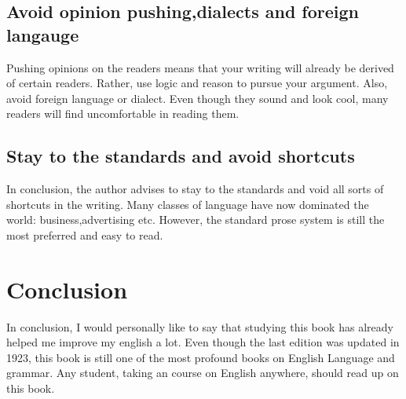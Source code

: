 \documentclass{report}
\begin{document}
\section{Avoid opinion pushing,dialects and foreign langauge}
Pushing opinions on the readers means that your writing will already be derived of certain readers. Rather, use logic and reason to pursue your argument. Also, avoid foreign language or dialect. Even though they sound and look cool, many readers will find uncomfortable in reading them.
\section{Stay to the standards and avoid shortcuts}
In conclusion, the author advises to stay to the standards and void all sorts of shortcuts in the writing. Many classes of language have now dominated the world: business,advertising etc. However, the standard prose system is still the most preferred and easy to read.


\chapter{Conclusion}
In conclusion, I would personally like to say that studying this book has already helped me improve my english a lot. Even though the last edition was updated in 1923, this book is still one of the most profound books on English Language and grammar. Any student, taking an course on English anywhere, should read up on this book.
\\
\\
\end{document}
